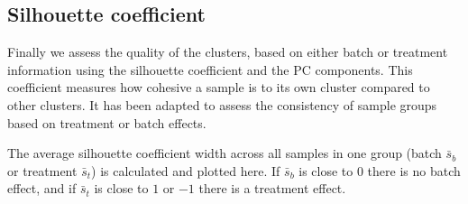\documentclass[]{book}
\begin{document}
\subsection{Silhouette coefficient}\label{silhouette-coefficient}

Finally we assess the quality of the clusters, based on either batch or
treatment information using the silhouette coefficient and the PC
components. This coefficient measures how cohesive a sample is to its
own cluster compared to other clusters. It has been adapted to assess
the consistency of sample groups based on treatment or batch effects.

The average silhouette coefficient width across all samples in one group
(batch \(\bar{s}_{b}\) or treatment \(\bar{s}_{t}\)) is calculated and
plotted here. If \(\bar{s}_{b}\) is close to \(0\) there is no batch
effect, and if \(\bar{s}_{t}\) is close to \(1\) or \(-1\) there is a
treatment effect.
\end{document}

